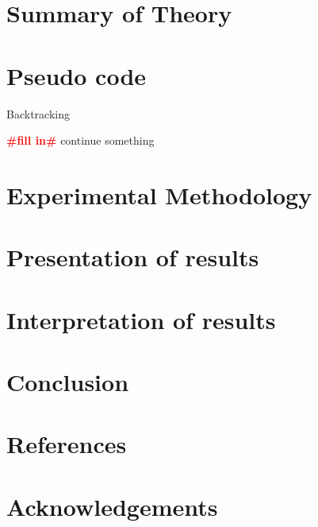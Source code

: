 \documentclass[12pt,a4paper,titlepage]{article}
\newcommand{\todo}[1]{\textcolor{red}{\textbf{\##1\#}}}
\begin{document}
\section{Summary of Theory}

\section{Pseudo code}
\begin{algorithm}
\caption{Backtracking}
\begin{algorithmic}
  \State \todo{fill in}
  \Else
  \State continue
  \EndIf
  \State \Return something
\EndFunction
\end{algorithmic}
\end{algorithm}

\section{Experimental Methodology}

\section{Presentation of results}

\section{Interpretation of results}

\section{Conclusion}

\section{References}

\section{Acknowledgements}
\end{document}
